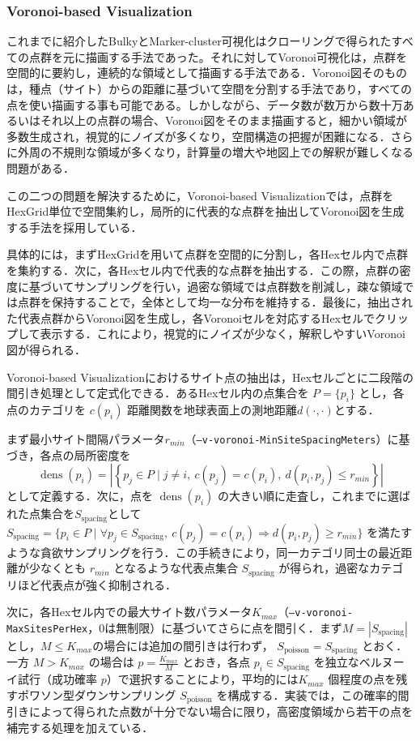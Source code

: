 \documentclass[11pt,a4paper]{jlreq}
\begin{document}
\subsubsection{Voronoi-based Visualization}

これまでに紹介したBulkyとMarker-cluster可視化はクローリングで得られたすべての点群を元に描画する手法であった。それに対してVoronoi可視化は，点群を空間的に要約し，連続的な領域として描画する手法である．Voronoi図そのものは，種点（サイト）からの距離に基づいて空間を分割する手法であり，すべての点を使い描画する事も可能である。しかしながら、データ数が数万から数十万あるいはそれ以上の点群の場合、Voronoi図をそのまま描画すると，細かい領域が多数生成され，視覚的にノイズが多くなり，空間構造の把握が困難になる．さらに外周の不規則な領域が多くなり，計算量の増大や地図上での解釈が難しくなる問題がある．

この二つの問題を解決するために，Voronoi-based Visualizationでは，点群をHexGrid単位で空間集約し，局所的に代表的な点群を抽出してVoronoi図を生成する手法を採用している．

具体的には，まずHexGridを用いて点群を空間的に分割し，各Hexセル内で点群を集約する．次に，各Hexセル内で代表的な点群を抽出する．この際，点群の密度に基づいてサンプリングを行い，過密な領域では点群数を削減し，疎な領域では点群を保持することで，全体として均一な分布を維持する．最後に，抽出された代表点群からVoronoi図を生成し，各Voronoiセルを対応するHexセルでクリップして表示する．これにより，視覚的にノイズが少なく，解釈しやすいVoronoi図が得られる．

Voronoi-based Visualizationにおけるサイト点の抽出は，Hexセルごとに二段階の間引き処理として定式化できる．あるHexセル内の点集合を $P = \{p_i\}$ とし，各点のカテゴリを $c(p_i)$ 距離関数を地球表面上の測地距離$d(\cdot,\cdot)$とする．

まず最小サイト間隔パラメータ$r_{min}$（\texttt{--v-voronoi-MinSiteSpacingMeters}）に基づき，各点の局所密度を
$$
  \operatorname{dens}(p_i)
  = \left| \left\{ p_j \in P \mid j \neq i,\ c(p_j) = c(p_i),\ d(p_i,p_j) \le r_{min} \right\} \right|
$$
として定義する．次に，点を $\operatorname{dens}(p_i)$ の大きい順に走査し，これまでに選ばれた点集合を$S_\text{spacing}$として$S_\text{spacing} = \{ p_i \in P \mid \forall p_j \in S_\text{spacing},\ c(p_j) = c(p_i) \Rightarrow d(p_i,p_j) \ge r_{min} \}$ を満たすような貪欲サンプリングを行う．この手続きにより，同一カテゴリ同士の最近距離が少なくとも $r_{min}$ となるような代表点集合 $S_\text{spacing}$ が得られ，過密なカテゴリほど代表点が強く抑制される．

次に，各Hexセル内での最大サイト数パラメータ$K_{max}$（\texttt{--v-voronoi-MaxSitesPerHex}，0は無制限）に基づいてさらに点を間引く．まず$M = |S_\text{spacing}|$とし，$M \le K_{max}$の場合には追加の間引きは行わず， $S_\text{poisson} = S_\text{spacing}$ とおく．一方 $M > K_{max}$ の場合は $p = \frac{K_{max}}{M}$ とおき，各点 $p_i \in S_\text{spacing}$ を独立なベルヌーイ試行（成功確率 \(p\)）で選択することにより，平均的には$ K_{max}$ 個程度の点を残すポワソン型ダウンサンプリング $S_\text{poisson}$ を構成する．実装では，この確率的間引きによって得られた点数が十分でない場合に限り，高密度領域から若干の点を補完する処理を加えている．
\end{document}
